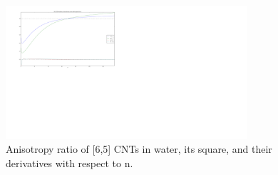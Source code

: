 \documentclass[a4paper]{article}
\begin{document}
\begin{center}
\begin{figure}[t!]
\begin{center}
    \includegraphics[width=0.8\textwidth,scale= 0.8]{plots/a_derivs_65.png}
\hskip 43pt
\caption{Anisotropy ratio of [6,5] CNTs in water, its square, and their
derivatives with respect to n.} 
\label{eiz65}
\end{center}
\end{figure} 
\end{center}

\end{document}
